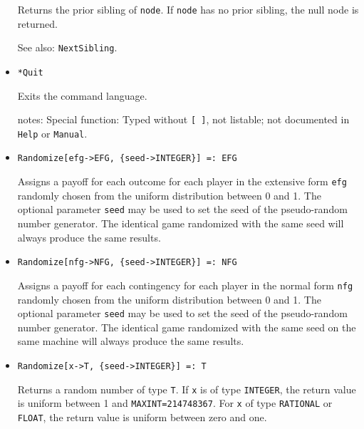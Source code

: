 \begin{itemize}
\bd
Returns the prior sibling of \verb+node+.  If \verb+node+ has
no prior sibling, the null node is returned.
\item [See also:] \verb+NextSibling+.
\ed




\item{}
\protect \large \begin{verbatim}
*Quit
\end{verbatim}\normalsize

\bd
Exits the command language.  
\item [notes:] Special function:  Typed without \verb+[ ]+, not
listable; not documented in \verb+Help+ or \verb+Manual+.  
\ed


\item{}
\protect \large \begin{verbatim}
Randomize[efg->EFG, {seed->INTEGER}] =: EFG
\end{verbatim}\normalsize

\bd
Assigns a payoff for each outcome for each player in the
extensive form \verb+efg+ randomly chosen from the uniform distribution
between 0 and 1.  The optional parameter \verb+seed+ may be used to
set the seed of the pseudo-random number generator.  The identical game
randomized with the same seed will always produce
the same results.
\ed

\item{}
\protect \large \begin{verbatim}
Randomize[nfg->NFG, {seed->INTEGER}] =: NFG
\end{verbatim}\normalsize

\bd
Assigns a payoff for each contingency for each player in
the normal form \verb+nfg+ randomly chosen from the uniform distribution
between 0 and 1.  The optional parameter \verb+seed+ may be used to
set the seed of the pseudo-random number generator.  The identical game
randomized with the same seed on the same machine will always produce
the same results.
\ed

\item{}
\protect \large \begin{verbatim}
Randomize[x->T, {seed->INTEGER}] =: T
\end{verbatim}\normalsize

\bd
Returns a random number of type \verb+T+.  If \verb+x+ is of type
\verb+INTEGER+, the return value is uniform between 1 and
\verb+MAXINT=214748367+.  For \verb+x+ of type \verb+RATIONAL+ or
\verb+FLOAT+, the return value is uniform between zero and one.  
\ed


\end{itemize}
